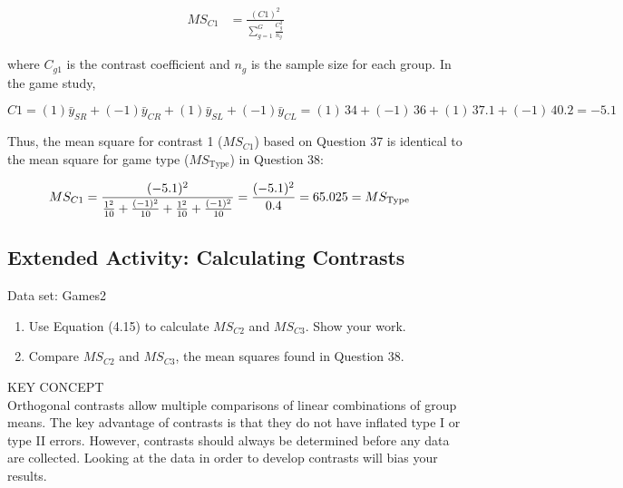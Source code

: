 \documentclass[
]{report}
\providecommand{\tightlist}{%
  \setlength{\itemsep}{0pt}\setlength{\parskip}{0pt}}
\begin{document}
\begin{align}
MS_{C1}
  &= \frac{(C1)^2}{\sum_{g=1}^G \frac{C_g^2}{n_g}}
  \tag{4.15}
\end{align}

where \(C_{g1}\) is the contrast coefficient and \(n_g\) is the sample size for each group. In the game study,

\[
C1 = (1)\bar y_{SR} + (-1)\bar y_{CR} + (1)\bar y_{SL} + (-1)\bar y_{CL}
   = (1)\,34 + (-1)\,36 + (1)\,37.1 + (-1)\,40.2
   = -5.1
\]

Thus, the mean square for contrast 1 (\(MS_{C1}\)) based on Question 37 is identical to the mean square for game type (\(MS_{\text{Type}}\)) in Question 38:

\begin{align}
MS_{C1}
  &= \frac{(-5.1)^2}{\frac{1^2}{10} + \frac{(-1)^2}{10} + \frac{1^2}{10} + \frac{(-1)^2}{10}}
  = \frac{(-5.1)^2}{0.4}
  = 65.025 
  = MS_{\text{Type}} \notag
\end{align}

\subsection{Extended Activity: Calculating Contrasts}\label{extended-activity-calculating-contrasts}

Data set: Games2

\begin{enumerate}
\def\labelenumi{\arabic{enumi}.}
\setcounter{enumi}{39}
\tightlist
\item
  Use Equation (4.15) to calculate \(MS_{C2}\) and \(MS_{C3}\). Show your work.\\
\item
  Compare \(MS_{C2}\) and \(MS_{C3}\), the mean squares found in Question 38.
\end{enumerate}

KEY CONCEPT\\
Orthogonal contrasts allow multiple comparisons of linear combinations of group means. The key advantage of contrasts is that they do not have inflated type I or type II errors. However, contrasts should always be determined before any data are collected. Looking at the data in order to develop contrasts will bias your results.
\end{document}
